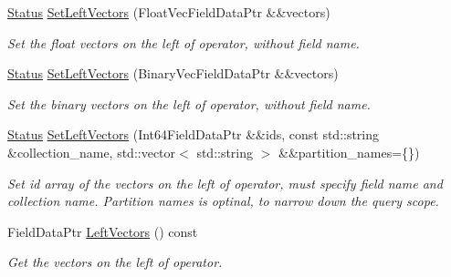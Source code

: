 \begin{DoxyCompactItemize}
\item 
\mbox{\label{classmilvus_1_1_calc_distance_arguments_afe700e8366e907b1348e6942b5f8bd7f}} 
\hyperlink{classmilvus_1_1_status}{Status} \hyperlink{classmilvus_1_1_calc_distance_arguments_afe700e8366e907b1348e6942b5f8bd7f}{Set\+Left\+Vectors} (Float\+Vec\+Field\+Data\+Ptr \&\&vectors)
\begin{DoxyCompactList}\small\item\em Set the float vectors on the left of operator, without field name. \end{DoxyCompactList}\item 
\mbox{\label{classmilvus_1_1_calc_distance_arguments_a5f47701301616a97590d99434eac03aa}} 
\hyperlink{classmilvus_1_1_status}{Status} \hyperlink{classmilvus_1_1_calc_distance_arguments_a5f47701301616a97590d99434eac03aa}{Set\+Left\+Vectors} (Binary\+Vec\+Field\+Data\+Ptr \&\&vectors)
\begin{DoxyCompactList}\small\item\em Set the binary vectors on the left of operator, without field name. \end{DoxyCompactList}\item 
\mbox{\label{classmilvus_1_1_calc_distance_arguments_acf43223811b29c5f373dff4885293008}} 
\hyperlink{classmilvus_1_1_status}{Status} \hyperlink{classmilvus_1_1_calc_distance_arguments_acf43223811b29c5f373dff4885293008}{Set\+Left\+Vectors} (Int64\+Field\+Data\+Ptr \&\&ids, const std\+::string \&collection\+\_\+name, std\+::vector$<$ std\+::string $>$ \&\&partition\+\_\+names=\{\})
\begin{DoxyCompactList}\small\item\em Set id array of the vectors on the left of operator, must specify field name and collection name. Partition names is optinal, to narrow down the query scope. \end{DoxyCompactList}\item 
\mbox{\label{classmilvus_1_1_calc_distance_arguments_a5354a8e20690b2fa95b3b0b31b1d1aea}} 
Field\+Data\+Ptr \hyperlink{classmilvus_1_1_calc_distance_arguments_a5354a8e20690b2fa95b3b0b31b1d1aea}{Left\+Vectors} () const
\begin{DoxyCompactList}\small\item\em Get the vectors on the left of operator. \end{DoxyCompactList}\item 

\end{DoxyCompactItemize}
